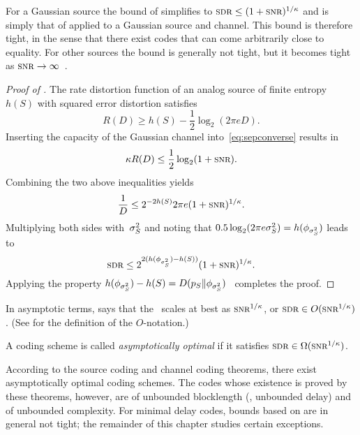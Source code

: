 \begin{remark}
  \label{rem:perflimitgaussiansource}
  For a Gaussian source the bound of  simplifies to $\sdr \le (1 +
  \snr)^{1/\k}$ and is simply that of  applied to a Gaussian
  source and channel. This bound is therefore tight, in the sense that there
  exist codes that can come arbitrarily close to equality. 
  For other sources the bound is generally not tight, but it becomes tight as
  $\snr \ra \infty$~\cite{LinderZ1994}.
\end{remark}

\begin{proof}[Proof of ]
  The rate distortion function of an analog source of finite entropy~$h(S)$
  with squared error distortion satisfies~\cite{Shannon1959}
  \begin{equation*}
    R(D) \ge h(S) - \frac12 \log_2(2\pi e D).
  \end{equation*}
  Inserting the capacity of the Gaussian channel into~\eqref{eq:sepconverse}
  results in
  \begin{equation*}
    \k R(D) \le \frac12 \log_2(1 + \snr).
  \end{equation*}
  Combining the two above inequalities yields
  \begin{equation*}
    \frac1D \le 2^{-2h(S)} 2\pi e (1 + \snr)^{1/\k}.
  \end{equation*}
  Multiplying both sides with~${\sigma_S^2}$ and noting that $0.5 \log_2(2\pi e {\sigma_S^2}) =
  h(\phi_{{\sigma_S^2}})$ leads to
  \begin{equation*}
    \sdr \le 2^{2(h(\phi_{\ssq}) - h(S))} (1 + \snr)^{1/\k}.
  \end{equation*}
  Applying the property $h(\phi_{{\sigma_S^2}}) - h(S) = D({p_S} \|
  \phi_{{\sigma_S^2}})$~\cite[Theorem~8.6.5]{CoverT1991} completes the proof.
\end{proof}

\begin{remark}
  \label{rem:asympbound}
  In asymptotic terms,  says that the \sdr\ scales at best as
  $\snr^{1/\k}$, or $\sdr \in O(\snr^{1/\k})$. (See  for the
  definition of the $O$-notation.)
\end{remark}

\begin{definition}
  A coding scheme is called \emph{asymptotically optimal} if it satisfies $\sdr
  \in \Omega(\snr^{1/\k})$.
\end{definition}


According to the source coding and channel coding theorems, there exist
asymptotically optimal coding schemes. The codes whose existence is proved by
these theorems, however, are of unbounded blocklength (\ie, unbounded delay) and
of unbounded complexity. For minimal delay codes, bounds based on
 are in general not tight; the remainder of this chapter
studies certain exceptions.


